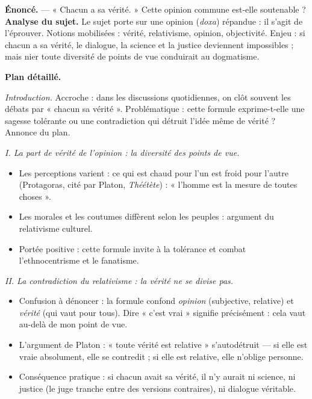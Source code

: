 \documentclass[11pt]{article}
\begin{document}
\begin{exoresolu}
\textbf{Énoncé.} — « Chacun a sa vérité. » Cette opinion commune est-elle soutenable ?
\tcblower
\textbf{Analyse du sujet.} Le sujet porte sur une opinion (\emph{doxa}) répandue : il s'agit de l'éprouver. Notions mobilisées : vérité, relativisme, opinion, objectivité. Enjeu : si chacun a sa vérité, le dialogue, la science et la justice deviennent impossibles ; mais nier toute diversité de points de vue conduirait au dogmatisme.

\textbf{Plan détaillé.}

\emph{Introduction.} Accroche : dans les discussions quotidiennes, on clôt souvent les débats par « chacun sa vérité ». Problématique : cette formule exprime-t-elle une sagesse tolérante ou une contradiction qui détruit l'idée même de vérité ? Annonce du plan.

\emph{I. La part de vérité de l'opinion : la diversité des points de vue.}
\begin{itemize}
\item Les perceptions varient : ce qui est chaud pour l'un est froid pour l'autre (Protagoras, cité par Platon, \emph{Théétète}) : « l'homme est la mesure de toutes choses ».
\item Les morales et les coutumes diffèrent selon les peuples : argument du relativisme culturel.
\item Portée positive : cette formule invite à la tolérance et combat l'ethnocentrisme et le fanatisme.
\end{itemize}

\emph{II. La contradiction du relativisme : la vérité ne se divise pas.}
\begin{itemize}
\item Confusion à dénoncer : la formule confond \emph{opinion} (subjective, relative) et \emph{vérité} (qui vaut pour tous). Dire « c'est vrai » signifie précisément : cela vaut au-delà de mon point de vue.
\item L'argument de Platon : « toute vérité est relative » s'autodétruit — si elle est vraie absolument, elle se contredit ; si elle est relative, elle n'oblige personne.
\item Conséquence pratique : si chacun avait sa vérité, il n'y aurait ni science, ni justice (le juge tranche entre des versions contraires), ni dialogue véritable.
\end{itemize}


\end{exoresolu}
\end{document}
